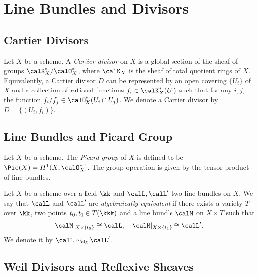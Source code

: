 \section{Line Bundles and Divisors}

\subsection{Cartier Divisors}

    \begin{definition}\label{def:Cartier_divisor}
        Let \(X\) be a scheme. 
        A \emph{Cartier divisor} on \(X\) is a global section of the sheaf of groups \(\calK_X^*/\calO_X^*\), where \(\calK_X\) is the sheaf of total quotient rings of \(X\).
        Equivalently, a Cartier divisor \(D\) can be represented by an open covering \(\{U_i\}\) of \(X\) and a collection of rational functions \(f_i \in \calK_X^*(U_i)\) such that for any \(i, j\), the function \(f_i/f_j \in \calO_X^*(U_i \cap U_j)\).
        We denote a Cartier divisor by \(D = \{(U_i, f_i)\}\).
    \end{definition}

\subsection{Line Bundles and Picard Group}

    \begin{definition}\label{def:picard_group}
        Let \(X\) be a scheme. 
        The \emph{Picard group} of \(X\) is defined to be \(\Pic(X) = H^1(X, \calO_X^*)\).
        The group operation is given by the tensor product of line bundles.
    \end{definition}

    \begin{definition}\label{def:algebraically_equivalent_line_bundles}
        Let \(X\) be a scheme over a field \(\kk\) and \(\calL, \calL'\) two line bundles on \(X\).
        We say that \(\calL\) and \(\calL'\) are \emph{algebraically equivalent} if there exists a  variety \(T\) over \(\kk\), two points \(t_0, t_1 \in T(\kkk)\) and a line bundle \(\calM\) on \(X \times T\) such that 
        \[ \calM|_{X \times \{t_0\}} \cong \calL, \quad \calM|_{X \times \{t_1\}} \cong \calL'. \]
        We denote it by \(\calL \sim_{\text{alg}} \calL'\).
    \end{definition}

\subsection{Weil Divisors and Reflexive Sheaves}

